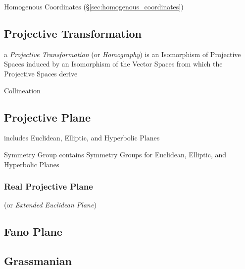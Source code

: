 Homogenous Coordinates (\S\ref{sec:homogenous_coordinates})



\subsection{Projective Transformation}
\label{sec:projective_transformation}

a \emph{Projective Transformation} (or \emph{Homography}) is an
Isomorphism of Projective Spaces induced by an Isomorphism of the
Vector Spaces from which the Projective Spaces derive

Collineation



\subsection{Projective Plane}\label{sec:projective_plane}

includes Euclidean, Elliptic, and Hyperbolic Planes

Symmetry Group contains Symmetry Groups for Euclidean, Elliptic, and
Hyperbolic Planes



\subsubsection{Real Projective Plane}\label{sec:real_projective_plane}

(or \emph{Extended Euclidean Plane})



\subsection{Fano Plane}\label{sec:fano_plane}

\subsection{Grassmanian}\label{sec:grassmanian}

